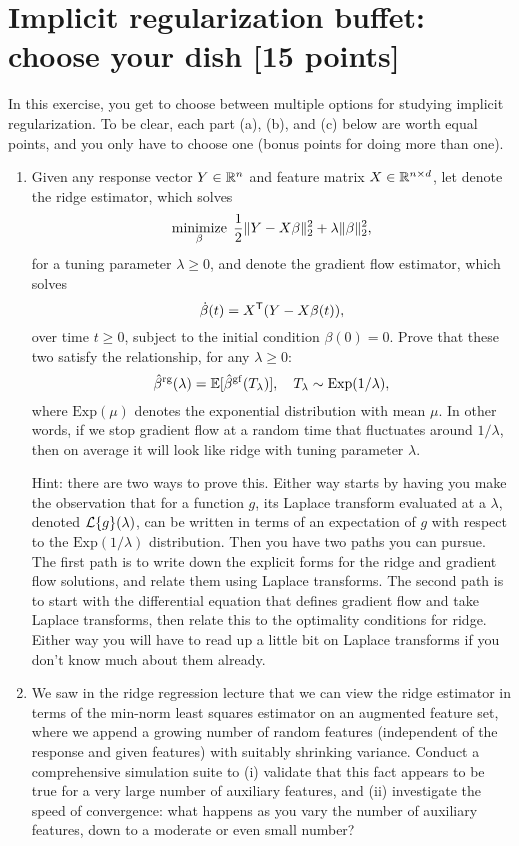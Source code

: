 \documentclass{article}
\begin{document}
\section{Implicit regularization buffet: choose your dish [15 points]} 

In this exercise, you get to choose between multiple options for studying
implicit regularization. To be clear, each part (a), (b), and (c) below are
worth equal points, and you only have to choose one (bonus points for doing more
than one). 

\begin{enumerate}[label=(\alph*)]
\item Given any response vector $Y \in \mathbb{R}^n$ and feature matrix $X \in \mathbb{R}^{n
    \times d}$, let  denote the ridge
  estimator, which solves  
  \[
  \mathop{\mathrm{minimize}}_\beta \; \frac{1}{2} \|Y - X\beta\|_2^2 + \lambda \|\beta\|_2^2,
  \]
  for a tuning parameter $\lambda \geq 0$, and 
  denote the gradient flow estimator, which solves 
  \[
  \dot\beta(t) = X^{\mathsf{T}} (Y - X\beta(t)),
  \]
  over time $t \geq 0$, subject to the initial condition $\beta(0)=0$. Prove
  that these two satisfy the relationship, for any $\lambda \geq 0$:
  \[
  \hat{\beta}^{\mathrm{rg}}(\lambda) = \mathbb{E}[ \hat{\beta}^{\mathrm{gf}}(T_\lambda) ], \quad 
  \text{$T_\lambda \sim \mathrm{Exp}(1/\lambda)$},
  \]
  where $\mathrm{Exp}(\mu)$ denotes the exponential distribution with mean
  $\mu$. In other words, if we stop gradient flow at a random time that
  fluctuates around $1/\lambda$, then on average it will look like ridge with 
  tuning parameter $\lambda$.

  Hint: there are two ways to prove this. Either way starts by having you make
  the observation that for a function $g$, its Laplace transform evaluated at a
  $\lambda$, denoted $\mathcal{L}\{g\}(\lambda)$, can be written in terms of an
  expectation of $g$ with respect to the $\mathrm{Exp}(1/\lambda)$ distribution.
  Then you have two paths you can pursue. The first path is to write down the 
  explicit forms for the ridge and gradient flow solutions, and relate them
  using Laplace transforms. The second path is to start with the differential
  equation that defines gradient flow and take Laplace transforms, then relate
  this to the optimality conditions for ridge. Either way you will have to read
  up a little bit on Laplace transforms if you don't know much about them
  already. 

\item We saw in the ridge regression lecture that we can view the ridge
  estimator in terms of the min-norm least squares estimator on an augmented
  feature set, where we append a growing number of random features (independent
  of the response and given features) with suitably shrinking variance. Conduct
  a comprehensive simulation suite to (i) validate that this fact appears to be
  true for a very large number of auxiliary features, and (ii) investigate the
  speed of convergence: what happens as you vary the number of auxiliary
  features, down to a moderate or even small number? 


\end{enumerate}
\end{document}
